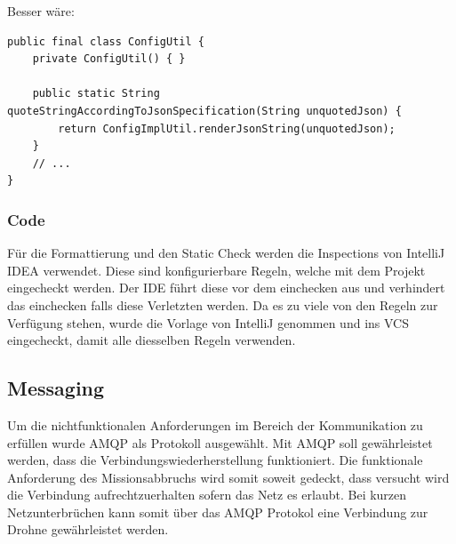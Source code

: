 Besser wäre:
\begin{lstlisting}
public final class ConfigUtil {
    private ConfigUtil() { }

    public static String quoteStringAccordingToJsonSpecification(String unquotedJson) {
        return ConfigImplUtil.renderJsonString(unquotedJson);
    }
    // ...
}
\end{lstlisting}

\subsubsection{Code}
Für die Formattierung und den Static Check werden die Inspections von IntelliJ IDEA verwendet.
Diese sind konfigurierbare Regeln, welche mit dem Projekt eingecheckt werden. Der IDE führt diese vor dem einchecken aus und verhindert das einchecken falls diese Verletzten werden.
Da es zu viele von den Regeln zur Verfügung stehen, wurde die Vorlage von IntelliJ genommen und ins VCS eingecheckt, damit alle diesselben Regeln verwenden.

\subsection{Messaging}

Um die nichtfunktionalen Anforderungen im Bereich der Kommunikation zu erfüllen wurde AMQP als Protokoll ausgewählt. Mit AMQP soll gewährleistet werden, dass die Verbindungswiederherstellung funktioniert. Die funktionale Anforderung des Missionsabbruchs wird somit soweit gedeckt, dass versucht wird die Verbindung aufrechtzuerhalten sofern das Netz es erlaubt. Bei kurzen Netzunterbrüchen kann somit über das AMQP Protokol eine Verbindung zur Drohne gewährleistet werden.

